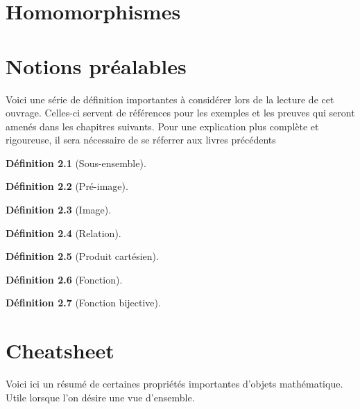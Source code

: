 \documentclass[12pt]{book}
\theoremstyle{definition}
\newtheorem{definition}{Définition}[section]
\begin{document}
\chapter{Homomorphismes}
\appendix
\chapter{Notions préalables}
Voici une série de définition importantes à considérer lors de la lecture de cet ouvrage. Celles-ci servent
de références pour les exemples et les preuves qui seront amenés dans les chapitres suivants. Pour une explication
plus complète et rigoureuse, il sera nécessaire de se réferrer aux livres précédents

\begin{definition}[Sous-ensemble]
    \label{def:sous_ensemble}
\end{definition}

\begin{definition}[Pré-image]
    \label{def:pre_image}
\end{definition}

\begin{definition}[Image]
    \label{def:image}
\end{definition}

\begin{definition}[Relation]
    \label{def:relation}
\end{definition}

\begin{definition}[Produit cartésien]
    \label{def:produit_cartesien}
\end{definition}

\begin{definition}[Fonction]
    \label{def:fonction}
\end{definition}

\begin{definition}[Fonction bijective]
    \label{def:bijective}
    
\end{definition}


\chapter{Cheatsheet}
Voici ici un résumé de certaines propriétés importantes d'objets mathématique. Utile lorsque l'on désire une vue d'ensemble.
\end{document}
